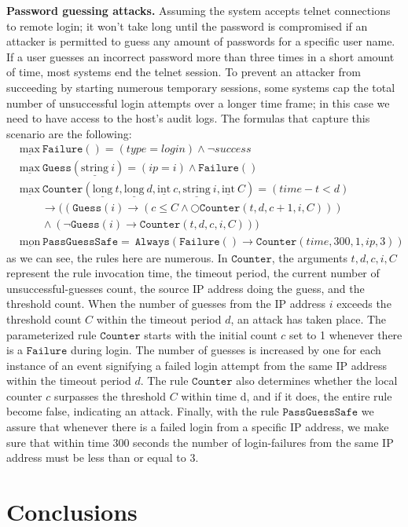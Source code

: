 \documentclass[english]{article}
\begin{document}
\textbf{Password guessing attacks.}
Assuming the system accepts telnet connections to remote login; it won't take long until the password is compromised if an attacker is permitted to guess any amount of passwords for a specific user name. If a user guesses an incorrect password more than three times in a short amount of time, most systems end the telnet session. To prevent an attacker from succeeding by starting numerous temporary sessions, some systems cap the total number of unsuccessful login attempts over a longer time frame; in this case we need to have access to the host's audit logs. The formulas that capture this scenario are the following:
\begin{align*}
    & \underline{\text{max}}\ \mathtt{Failure}() = (type=login)\land \neg success\\
    & \underline{\text{max}}\ \mathtt{Guess}(\underline{\text{string}}\ i) = (ip=i)\land \mathtt{Failure}()\\
    & \underline{\text{max}}\ \mathtt{Counter}(\underline{\text{long}}\ t, \underline{\text{long}}\ d, \underline{\text{int}}\ c,\underline{\text{string}}\ i,\underline{\text{int}}\ C) = (time-t<d)\\
    & \quad\quad\rightarrow((\mathtt{Guess}(i)\rightarrow(c\leq C\land \bigcirc\mathtt{Counter}(t,d,c+1,i,C)))  \\
    & \quad\quad\land(\neg \mathtt{Guess}(i)\rightarrow\mathtt{Counter}(t,d,c,i,C))) \\
    & \underline{\text{mon}}\ \mathtt{PassGuessSafe} =\ \mathtt{Always}(\mathtt{Failure}()\rightarrow\mathtt{Counter}(time,300,1,ip,3)) 
\end{align*}
as we can see, the rules here are numerous. In $\mathtt{Counter}$, the arguments $t, d, c, i, C$ represent the rule invocation time, the timeout period, the current number of unsuccessful-guesses count, the source IP address doing the guess, and the threshold count. When the number of guesses from the IP address $i$ exceeds the threshold count $C$ within the timeout period $d$, an attack has taken place. The parameterized rule $\mathtt{Counter}$ starts with the initial count $c$ set to 1 whenever there is a $\mathtt{Failure}$ during login. The number of guesses is increased by one for each instance of an event signifying a failed login attempt from the same IP address within the timeout period $d$. The rule $\mathtt{Counter}$ also determines whether the local counter $c$ surpasses the threshold $C$ within time d, and if it does, the entire rule become false, indicating an attack. Finally, with the rule $\mathtt{PassGuessSafe}$ we assure that whenever there is a failed login from a specific IP address, we make sure that within time $300$ seconds the number of login-failures from the same IP address must be less than or equal to $3$.

\section{Conclusions}

\printbibliography
\end{document}
